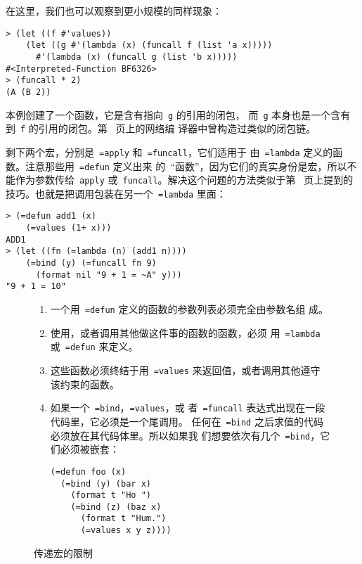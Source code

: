 在这里，我们也可以观察到更小规模的同样现象：
\begin{lstlisting}
> (let ((f #'values))
    (let ((g #'(lambda (x) (funcall f (list 'a x)))))
      #'(lambda (x) (funcall g (list 'b x)))))
#<Interpreted-Function BF6326>
> (funcall * 2)
(A (B 2))
\end{lstlisting}
本例创建了一个函数，它是含有指向~\texttt{g} 的引用的闭包，
而~\texttt{g} 本身也是一个含有到~\texttt{f} 的引用的闭包。第~\pageref{fig:compilation_with_static_reference} 页上的网络编
译器中曾构造过类似的闭包链。

剩下两个宏，分别是~\texttt{=apply} 和~\texttt{=funcall}，它们适用于
由~\texttt{=lambda} 定义的函数。注意那些用~\texttt{=defun} 定义出来
的~``函数''，因为它们的真实身份是宏，所以不能作为参数传给~\texttt{apply}
或~\texttt{funcall}。解决这个问题的方法类似于第~\pageref{the_cons_4}
页上提到的技巧。也就是把调用包装在另一个~\texttt{=lambda} 里面：
\begin{lstlisting}
> (=defun add1 (x)
    (=values (1+ x)))
ADD1
> (let ((fn (=lambda (n) (add1 n))))
    (=bind (y) (=funcall fn 9)
      (format nil "9 + 1 = ~A" y)))
"9 + 1 = 10"
\end{lstlisting}

\begin{figure}
  \begin{enumerate}
  \item 一个用~\texttt{=defun} 定义的函数的参数列表必须完全由参数名组
    成。
  \item 使用\continuation{}，或者调用其他做这件事的函数的函数，必须
    用~\texttt{=lambda} 或~\texttt{=defun} 来定义。
  \item 这些函数必须终结于用~\texttt{=values} 来返回值，或者调用其他遵守
    该约束的函数。
  \item\label{itm:tail-call} 如果一个~\texttt{=bind}，\texttt{=values}，或
    者~\texttt{=funcall} 表达式出现在一段代码里，它必须是一个尾调用。
    任何在~\texttt{=bind} 之后求值的代码必须放在其代码体里。所以如果我
    们想要依次有几个~\texttt{=bind}，它们必须被嵌套：
\begin{lstlisting}
(=defun foo (x)
  (=bind (y) (bar x)
    (format t "Ho ")
    (=bind (z) (baz x)
      (format t "Hum.")
      (=values x y z))))
\end{lstlisting}
  \end{enumerate}
  \caption{\continuation{}传递宏的限制}
  \label{fig:restrictions_on_continuation-passing_macros}
\end{figure}

